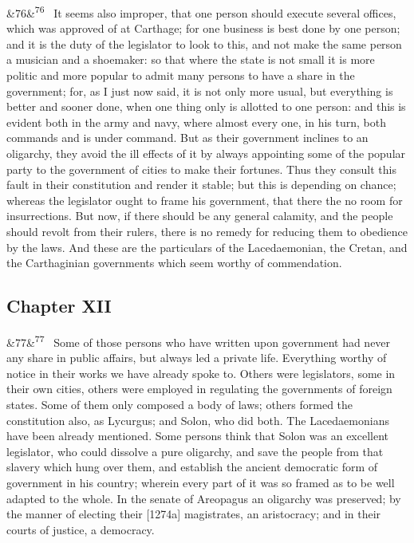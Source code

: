 \documentclass[12pt]{article}
\newcommand{\para}[1][]{\par\noindent\ifx&#1&\else\textsuperscript{\footnotesize #1}~\fi}
\begin{document}
\para[76] It seems also improper, that one person should execute several offices, which was approved of at Carthage; for one business is best done by one person; and it is the duty of the legislator to look to this, and not make the same person a musician and a shoemaker: so that where the state is not small it is more politic and more popular to admit many persons to have a share in the government; for, as I just now said, it is not only more usual, but everything is better and sooner done, when one thing only is allotted to one person: and this is evident both in the army and navy, where almost every one, in his turn, both commands and is under command. But as their government inclines to an oligarchy, they avoid the ill effects of it by always appointing some of the popular party to the government of cities to make their fortunes. Thus they consult this fault in their constitution and render it stable; but this is depending on chance; whereas the legislator ought to frame his government, that there the no room for insurrections. But now, if there should be any general calamity, and the people should revolt from their rulers, there is no remedy for reducing them to obedience by the laws. And these are the particulars of the Lacedaemonian, the Cretan, and the Carthaginian governments which seem worthy of commendation.

\subsection*{Chapter XII}

\para[77] Some of those persons who have written upon government had never any share in public affairs, but always led a private life. Everything worthy of notice in their works we have already spoke to. Others were legislators, some in their own cities, others were employed in regulating the governments of foreign states. Some of them only composed a body of laws; others formed the constitution also, as Lycurgus; and Solon, who did both. The Lacedaemonians have been already mentioned. Some persons think that Solon was an excellent legislator, who could dissolve a pure oligarchy, and save the people from that slavery which hung over them, and establish the ancient democratic form of government in his country; wherein every part of it was so framed as to be well adapted to the whole. In the senate of Areopagus an oligarchy was preserved; by the manner of electing their [1274a] magistrates, an aristocracy; and in their courts of justice, a democracy.
\end{document}
